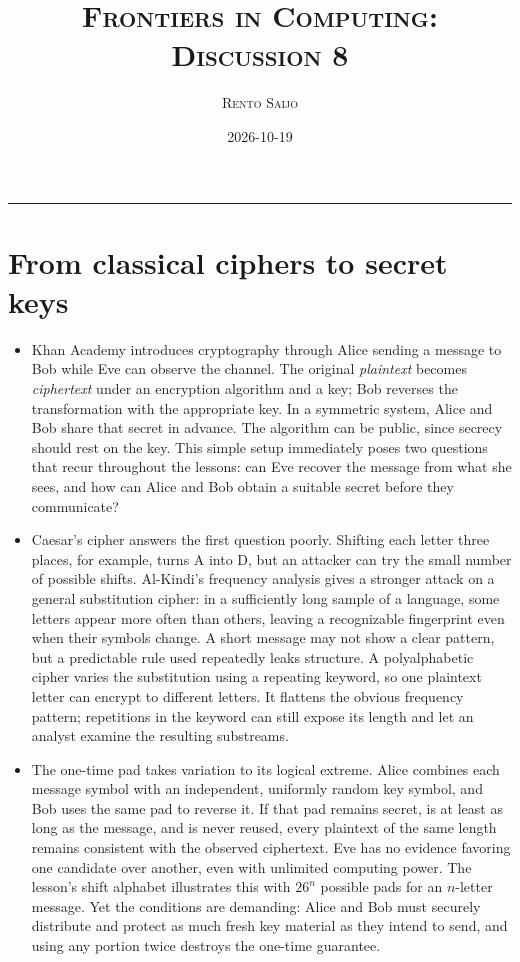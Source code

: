 \documentclass[10pt]{article}
\title{\Large\textsc{Frontiers in Computing: Discussion 8}}
\author{\large\textsc{Rento Saijo}}
\date{2026-10-19}
\begin{document}
\maketitle
\thispagestyle{fancy}
\vspace{-1em}\rule{\linewidth}{0.6pt}\vspace{0.5em}

\section*{From classical ciphers to secret keys}

\begin{itemize}[leftmargin=1.25em, itemsep=0.3em, parsep=0pt, topsep=0pt]
    \item Khan Academy introduces cryptography through Alice sending a message to Bob while Eve can observe the channel. The original \textit{plaintext} becomes \textit{ciphertext} under an encryption algorithm and a key; Bob reverses the transformation with the appropriate key. In a symmetric system, Alice and Bob share that secret in advance. The algorithm can be public, since secrecy should rest on the key. This simple setup immediately poses two questions that recur throughout the lessons: can Eve recover the message from what she sees, and how can Alice and Bob obtain a suitable secret before they communicate?

    \item Caesar's cipher answers the first question poorly. Shifting each letter three places, for example, turns A into D, but an attacker can try the small number of possible shifts. Al-Kindi's frequency analysis gives a stronger attack on a general substitution cipher: in a sufficiently long sample of a language, some letters appear more often than others, leaving a recognizable fingerprint even when their symbols change. A short message may not show a clear pattern, but a predictable rule used repeatedly leaks structure. A polyalphabetic cipher varies the substitution using a repeating keyword, so one plaintext letter can encrypt to different letters. It flattens the obvious frequency pattern; repetitions in the keyword can still expose its length and let an analyst examine the resulting substreams.

    \item The one-time pad takes variation to its logical extreme. Alice combines each message symbol with an independent, uniformly random key symbol, and Bob uses the same pad to reverse it. If that pad remains secret, is at least as long as the message, and is never reused, every plaintext of the same length remains consistent with the observed ciphertext. Eve has no evidence favoring one candidate over another, even with unlimited computing power. The lesson's shift alphabet illustrates this with \(26^n\) possible pads for an \(n\)-letter message. Yet the conditions are demanding: Alice and Bob must securely distribute and protect as much fresh key material as they intend to send, and using any portion twice destroys the one-time guarantee.
\end{itemize}
\end{document}
